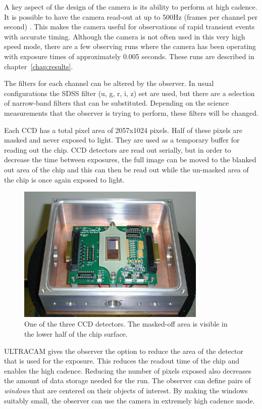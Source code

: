 A key aspect of the design of the camera is its ability to perform at high cadence. It is possible to have the camera read-out at up to 500Hz (frames per channel per second) \cite{dhillon07}. This makes the camera useful for observations of rapid transient events with accurate timing. Although the camera is not often used in this very high speed mode, there are a few observing runs where the camera has been operating with exposure times of approximately 0.005 seconds. These runs are described in chapter~\ref{chap:results}.

The filters for each channel can be altered by the observer. In usual configurations the SDSS filter (u, g, r, i, z) set are used, but there are a selection of narrow-band filters that can be substituted. Depending on the science measurements that the observer is trying to perform, these filters will be changed.   

Each CCD has a total pixel area of 2057x1024 pixels. Half of these pixels are masked and never exposed to light. They are used as a temporary buffer for reading out the chip. CCD detectors are read out serially, but in order to decrease the time between exposures, the full image can be moved to the blanked out area of the chip and this can then be read out while the un-masked area of the chip is once again exposed to light. 

\begin{figure}[!h]
\centering
\includegraphics[width=90mm]{images/ccd.png}
\caption{One of the three CCD detectors. The masked-off area is visible in the lower half of the chip surface.}
\label{fig2}
\end{figure}

ULTRACAM gives the observer the option to reduce the area of the detector that is used for the exposure. This reduces the readout time of the chip and enables the high cadence. Reducing the number of pixels exposed also decreases the amount of data storage needed for the run. The observer can define pairs of \emph{windows} that are centered on their objects of interest. By making the windows suitably small, the observer can use the camera in extremely high cadence mode. 

